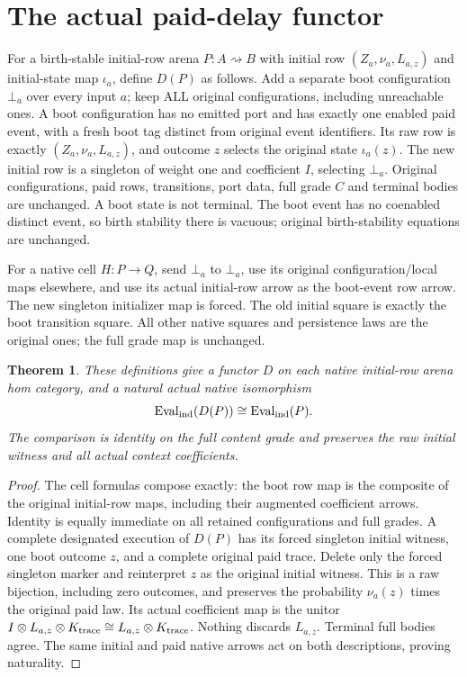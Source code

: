\documentclass[11pt]{article}
\newtheorem{theorem}{Theorem}\newtheorem{proposition}{Proposition}
\begin{document}
\section{The actual paid-delay functor}
For a birth-stable initial-row arena $P:A\rightsquigarrow B$ with initial row
$(Z_a,\nu_a,L_{a,z})$ and initial-state map $\iota_a$, define $D(P)$ as follows.
Add a separate boot configuration $\bot_a$ over every input $a$; keep ALL
original configurations, including unreachable ones. A boot configuration
has no emitted port and has exactly one enabled paid event, with a fresh
boot tag distinct from original event identifiers. Its raw row is exactly
$(Z_a,\nu_a,L_{a,z})$, and outcome $z$ selects the original state $\iota_a(z)$.
The new initial row is a singleton of weight one and coefficient $I$, selecting
$\bot_a$. Original configurations, paid rows, transitions, port data, full
grade $C$ and terminal bodies are unchanged. A boot state is not terminal.
The boot event has no coenabled distinct event, so birth stability there is
vacuous; original birth-stability equations are unchanged.

For a native cell $H:P\to Q$, send $\bot_a$ to $\bot_a$, use its original
configuration/local maps elsewhere, and use its actual initial-row arrow as
the boot-event row arrow. The new singleton initializer map is forced. The
old initial square is exactly the boot transition square. All other native
squares and persistence laws are the original ones; the full grade map is
unchanged.
\begin{theorem}
These definitions give a functor $D$ on each native initial-row arena hom
category, and a natural actual native isomorphism
\[
 \operatorname{Eval}_{\rm ind}(D(P))\cong
 \operatorname{Eval}_{\rm ind}(P).
\]
The comparison is identity on the full content grade and preserves the raw
initial witness and all actual context coefficients.
\end{theorem}
\begin{proof}
The cell formulas compose exactly: the boot row map is the composite of the
original initial-row maps, including their augmented coefficient arrows.
Identity is equally immediate on all retained configurations and full grades.
A complete designated execution of $D(P)$ has its forced singleton initial
witness, one boot outcome $z$, and a complete original paid trace. Delete only
the forced singleton marker and reinterpret $z$ as the original initial
witness. This is a raw bijection, including zero outcomes, and preserves the
probability $\nu_a(z)$ times the original paid law. Its actual coefficient
map is the unitor
$I\otimes L_{a,z}\otimes K_{\rm trace}\cong L_{a,z}\otimes K_{\rm trace}$.
Nothing discards $L_{a,z}$. Terminal full bodies agree. The same initial and
paid native arrows act on both descriptions, proving naturality.
\end{proof}
\end{document}

